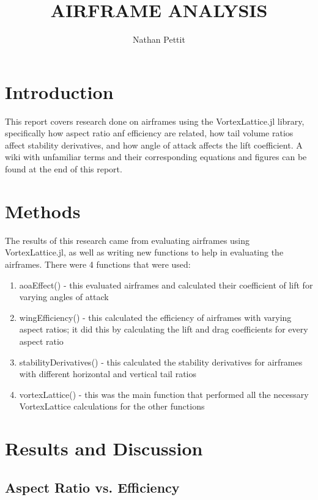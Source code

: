 \documentclass{journal}
\title{AIRFRAME ANALYSIS}
\author{Nathan Pettit}
\begin{document}
	
	\maketitle	
	
	\section{Introduction}
	
	This report covers research done on airframes using the VortexLattice.jl library, specifically how aspect ratio anf efficiency are related, how tail volume ratios affect stability derivatives, and how angle of attack affects the lift coefficient. A wiki with unfamiliar terms and their corresponding equations and figures can be found at the end of this report.
	
	\section{Methods}
	The results of this research came from evaluating airframes using VortexLattice.jl, as well as writing new functions to help in evaluating the airframes. There were 4 functions that were  used:
	
	\begin{enumerate}
		\item aoaEffect() - this evaluated airframes and calculated their coefficient of lift for varying angles of attack 
		\item wingEfficiency() - this calculated the efficiency of airframes with varying aspect ratios; it did this by calculating the lift and drag coefficients for every aspect ratio
		\item stabilityDerivatives() - this calculated the stability derivatives for airframes with different horizontal and vertical tail ratios
		\item vortexLattice() - this was the main function that performed all the necessary VortexLattice calculations for the other functions 
	\end{enumerate}
	
	\section{Results and Discussion}
	
	\subsection{Aspect Ratio vs. Efficiency}
	
\end{document}
